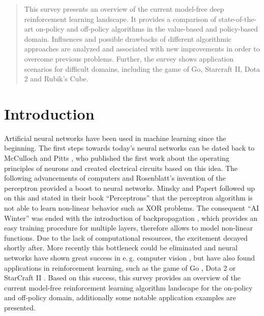    \date{Received: date / Accepted: date}

    \maketitle
    \begin{abstract}
		This survey presents an overview of the current model-free deep reinforcement learning landscape. 
		It provides a comparison of state-of-the-art on-policy and off-policy algorithms in the value-based and policy-based domain.
		Influences and possible drawbacks of different algorithmic approaches are analyzed and associated with new improvements in order to overcome previous problems.
		Further, the survey shows application scenarios for difficult domains, including the game of Go, Starcraft II, Dota 2 and Rubik's Cube.
    \end{abstract}

    \section{Introduction \label{sec:intro}}
    Artificial neural networks have been used in machine learning since the beginning. 
    The first steps towards today's neural networks can be dated back to McCulloch and Pitts \cite{McCulloch1943}, who published the first work about the operating principles of neurons and created electrical circuits based on this idea.
	The following advancements of computers and Rosenblatt's invention of the perceptron \cite{Rosenblatt1958} provided a boost to neural networks.  
    Minsky and Papert followed up on this and stated in their book ``Perceptrons'' \cite{Minsky2017} that the perceptron algorithm is not able to learn non-linear behavior such as XOR problems.
	The consequent ``AI Winter'' was ended with the introduction of backpropagation \cite{Rumelhart1986}, which provides an easy training procedure for multiple layers, therefore allows to model non-linear functions.
    Due to the lack of computational resources, the excitement decayed shortly after.
    More recently this bottleneck could be eliminated and neural networks have shown great success in e.\,g. computer vision \cite{Krizhevsky2012,He2016}, but have also found applications in reinforcement learning, such as the game of Go \cite{Silver2017}, Dota 2 \cite{OpenAI2018} or StarCraft II \cite{Vinyals2019}.
    Based on this success, this survey provides an overview of the current model-free reinforcement learning algorithm landscape for the on-policy and off-policy domain, additionally some notable application examples are presented.
    
